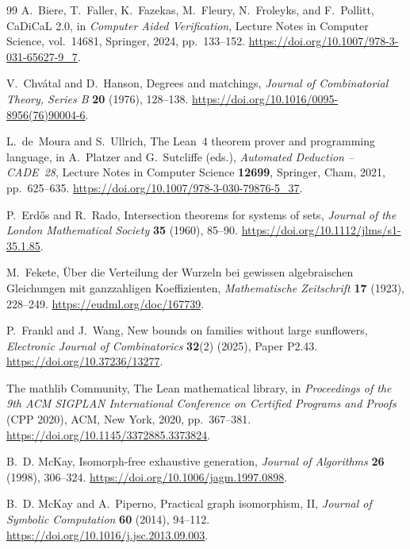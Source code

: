 \documentclass[11pt]{article}
\numberwithin{equation}{section}
\theoremstyle{definition}
\theoremstyle{remark}
\begin{document}
\begin{thebibliography}{99}
A.~Biere, T.~Faller, K.~Fazekas, M.~Fleury, N.~Froleyks, and F.~Pollitt,
\newblock CaDiCaL 2.0,
\newblock in \emph{Computer Aided Verification}, Lecture Notes in Computer
  Science, vol.~14681, Springer, 2024, pp.~133--152.
\newblock \url{https://doi.org/10.1007/978-3-031-65627-9_7}.

V.~Chv\'atal and D.~Hanson,
\newblock Degrees and matchings,
\newblock \emph{Journal of Combinatorial Theory, Series B} \textbf{20}
  (1976), 128--138.
\newblock \url{https://doi.org/10.1016/0095-8956(76)90004-6}.

L.~de~Moura and S.~Ullrich,
\newblock The Lean~4 theorem prover and programming language,
\newblock in A.~Platzer and G.~Sutcliffe (eds.), \emph{Automated Deduction --
  CADE~28}, Lecture Notes in Computer Science \textbf{12699}, Springer, Cham,
  2021, pp.~625--635.
\newblock \url{https://doi.org/10.1007/978-3-030-79876-5_37}.

P.~Erd\H{o}s and R.~Rado,
\newblock Intersection theorems for systems of sets,
\newblock \emph{Journal of the London Mathematical Society} \textbf{35}
  (1960), 85--90.
\newblock \url{https://doi.org/10.1112/jlms/s1-35.1.85}.

M.~Fekete,
\newblock \"Uber die Verteilung der Wurzeln bei gewissen algebraischen
  Gleichungen mit ganzzahligen Koeffizienten,
\newblock \emph{Mathematische Zeitschrift} \textbf{17} (1923), 228--249.
\newblock \url{https://eudml.org/doc/167739}.

P.~Frankl and J.~Wang,
\newblock New bounds on families without large sunflowers,
\newblock \emph{Electronic Journal of Combinatorics} \textbf{32}(2)
  (2025), Paper P2.43.
\newblock \url{https://doi.org/10.37236/13277}.

The mathlib Community,
\newblock The Lean mathematical library,
\newblock in \emph{Proceedings of the 9th ACM SIGPLAN International
  Conference on Certified Programs and Proofs} (CPP 2020), ACM, New York,
  2020, pp.~367--381.
\newblock \url{https://doi.org/10.1145/3372885.3373824}.

B.~D. McKay,
\newblock Isomorph-free exhaustive generation,
\newblock \emph{Journal of Algorithms} \textbf{26} (1998), 306--324.
\newblock \url{https://doi.org/10.1006/jagm.1997.0898}.

B.~D. McKay and A.~Piperno,
\newblock Practical graph isomorphism, II,
\newblock \emph{Journal of Symbolic Computation} \textbf{60} (2014), 94--112.
\newblock \url{https://doi.org/10.1016/j.jsc.2013.09.003}.


\end{thebibliography}
\end{document}
